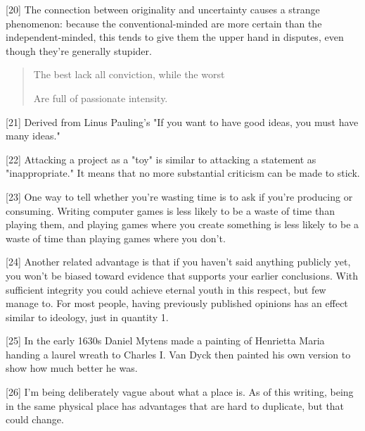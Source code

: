 [20] The connection between originality and uncertainty causes a
                  strange phenomenon: because the conventional-minded are more
                  certain than the independent-minded, this tends to give them
                  the upper hand in disputes, even though they're generally
                  stupider.
                  \begin{quote}

                    The best lack all conviction, while the worst

                    Are full of passionate intensity.
                  
\end{quote}

                  [21] Derived from Linus Pauling's "If you want to have good
                  ideas, you must have many ideas."

[22] Attacking a project as a "toy" is similar to attacking a
                  statement as "inappropriate." It means that no more
                  substantial criticism can be made to stick.

[23] One way to tell whether you're wasting time is to ask if
                  you're producing or consuming. Writing computer games is less
                  likely to be a waste of time than playing them, and playing
                  games where you create something is less likely to be a waste
                  of time than playing games where you don't.

[24] Another related advantage is that if you haven't said
                  anything publicly yet, you won't be biased toward evidence
                  that supports your earlier conclusions. With sufficient
                  integrity you could achieve eternal youth in this respect, but
                  few manage to. For most people, having previously published
                  opinions has an effect similar to ideology, just in quantity
                  1.

[25] In the early 1630s Daniel Mytens made a painting of
                  Henrietta Maria handing a laurel wreath to Charles I. Van Dyck
                  then painted his own version to show how much better he
                  was.

[26] I'm being deliberately vague about what a place is. As of
                  this writing, being in the same physical place has advantages
                  that are hard to duplicate, but that could change.

